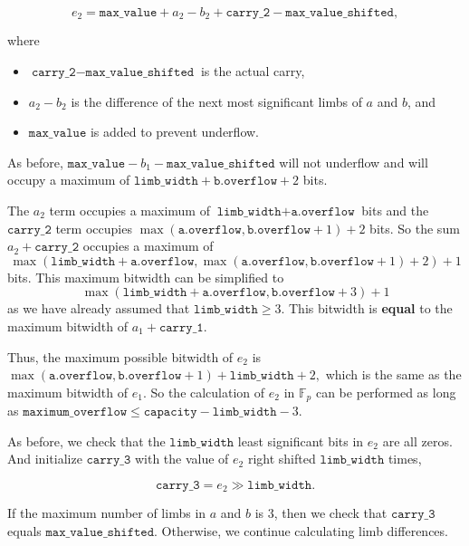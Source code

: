 \documentclass[a4paper, 12pt]{article}
\begin{document}
\begin{itemize}
    $$e_2 = \texttt{max\_value} + a_2 - b_2 + \texttt{carry\_2} - \texttt{max\_value\_shifted},$$

    where

    \begin{itemize}
      \item  $\texttt{carry\_2} - \texttt{max\_value\_shifted}$ is the actual carry,
      \item  $a_2 - b_2$ is the difference of the next most significant limbs of $a$ and $b$, and
      \item $\texttt{max\_value}$ is added to prevent underflow.
    \end{itemize}

    As before, $\texttt{max\_value} - b_1 - \texttt{max\_value\_shifted}$ will not underflow and will occupy a maximum of $\texttt{limb\_width} + \texttt{b.overflow} + 2$ bits.

    The $a_2$ term occupies a maximum of $\texttt{limb\_width} + \texttt{a.overflow}$ bits and the $\texttt{carry\_2}$ term occupies $\max(\texttt{a.overflow}, \texttt{b.overflow} + 1) + 2$ bits. So the sum $a_2 + \texttt{carry\_2}$ occupies a maximum of 
    $$\max(\texttt{limb\_width} + \texttt{a.overflow}, \max(\texttt{a.overflow}, \texttt{b.overflow} + 1) + 2) + 1$$
    bits. This maximum bitwidth can be simplified to 
    $$\max(\texttt{limb\_width} + \texttt{a.overflow}, \texttt{b.overflow} + 3) + 1$$
    as we have already assumed that $\texttt{limb\_width} \ge 3$. This bitwidth is \textbf{equal} to the maximum bitwidth of $a_1 + \texttt{carry\_1}$.

    Thus, the maximum possible bitwidth of $e_2$ is $\max(\texttt{a.overflow}, \texttt{b.overflow} + 1) + \texttt{limb\_width} + 2,$ which is the same as the maximum bitwidth of $e_1$. So the calculation of $e_2$ in $\mathbb{F}_p$ can be performed as long as $\texttt{maximum\_overflow} \le \texttt{capacity} - \texttt{limb\_width} - 3$.

    As before, we check that the $\texttt{limb\_width}$ least significant bits in $e_2$ are all zeros. And initialize $\texttt{carry\_3}$ with the value of $e_2$ right shifted $\texttt{limb\_width}$ times,

    $$\texttt{carry\_3} = e_2 \gg \texttt{limb\_width}.$$

    If the maximum number of limbs in $a$ and $b$ is 3, then we check that $\texttt{carry\_3}$ equals $\texttt{max\_value\_shifted}$. Otherwise, we continue calculating limb differences.
\end{itemize}
\end{document}
